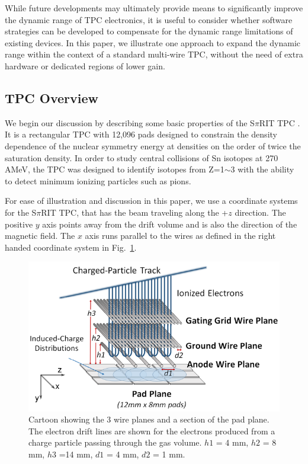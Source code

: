 \documentclass[review,number,sort&compress]{elsarticle}
\begin{document}
While future developments may ultimately provide means to significantly improve the dynamic range of TPC electronics, it is useful to consider whether software strategies can be developed to compensate for the dynamic range limitations of existing devices. In this paper, we illustrate one approach to expand the dynamic range within the context of a standard multi-wire TPC, without the need of extra hardware or dedicated regions of lower gain.


\subsection{TPC Overview}
We begin our discussion by describing some basic properties of the S$\pi$RIT TPC \citep{shane}. It is a rectangular TPC with 12,096 pads designed to constrain the density dependence of the nuclear symmetry energy at densities on the order of twice the saturation density. In order to study central collisions of Sn isotopes at 270 AMeV, the TPC was designed to identify isotopes from Z=1$\sim$3 with the ability to detect minimum ionizing particles such as pions. 

For ease of illustration and discussion in this paper, we use a coordinate systems for the S$\pi$RIT TPC, that has the beam traveling along the +$z$ direction. The positive $y$ axis points away from the drift volume and is also the direction of the magnetic field. The $x$ axis runs parallel to the wires as defined in the right handed coordinate system in Fig.~\ref{fig:padwire}.

\begin{figure}[ht!]
\includegraphics[width=\linewidth]{fig2}
\caption{Cartoon showing the 3 wire planes and a section of the pad plane. The  electron drift lines are shown for the electrons produced from a charge particle passing through the gas volume. $h1$ = 4 mm, $h2$ = 8 mm, $h3$ =14 mm, $d1$ = 4 mm, $d2$ = 1 mm.}
\label{fig:padwire}
\end{figure}
\end{document}
